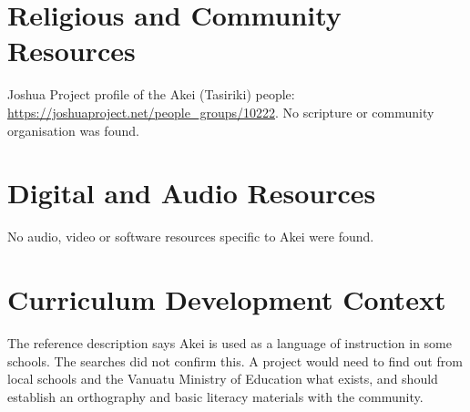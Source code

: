 \documentclass[12pt]{article}
\begin{document}
\section{Religious and Community Resources}
Joshua Project profile of the Akei (Tasiriki) people: \url{https://joshuaproject.net/people_groups/10222}. No scripture or community organisation was found.

\section{Digital and Audio Resources}
No audio, video or software resources specific to Akei were found.

\section{Curriculum Development Context}
The reference description says Akei is used as a language of instruction in some schools. The searches did not confirm this. A project would need to find out from local schools and the Vanuatu Ministry of Education what exists, and should establish an orthography and basic literacy materials with the community.
\end{document}

